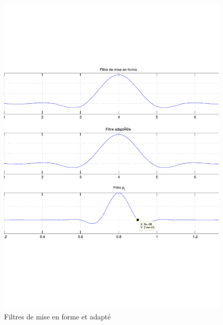 \documentclass[a4paper,11pt]{article}
\begin{document}
\begin{figure}
	\begin{center}
	\includegraphics[scale=0.5]{Q8-2.pdf}
	\caption{Filtres de mise en forme et adapté}
	\label{fig:ques8-2}
	\end{center}
\end{figure} 
\end{document}
